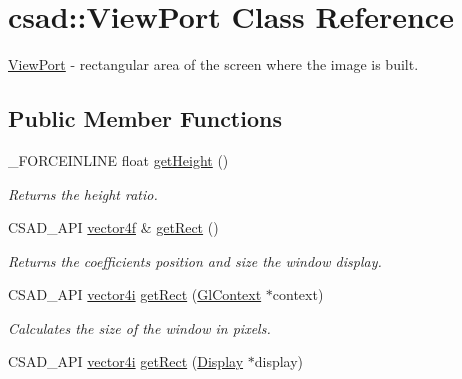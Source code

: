 \hypertarget{classcsad_1_1_view_port}{\section{csad\-:\-:View\-Port Class Reference}
\label{classcsad_1_1_view_port}
}


\hyperlink{classcsad_1_1_view_port}{View\-Port} -\/ rectangular area of the screen where the image is built.  


\subsection*{Public Member Functions}
\begin{DoxyCompactItemize}
\item 
\hypertarget{classcsad_1_1_view_port_a8e7daa8559a2fa9be052f44ba3d3e703}{\-\_\-\-F\-O\-R\-C\-E\-I\-N\-L\-I\-N\-E float \hyperlink{classcsad_1_1_view_port_a8e7daa8559a2fa9be052f44ba3d3e703}{get\-Height} ()}\label{classcsad_1_1_view_port_a8e7daa8559a2fa9be052f44ba3d3e703}

\begin{DoxyCompactList}\small\item\em Returns the height ratio. \end{DoxyCompactList}\item 
\hypertarget{classcsad_1_1_view_port_a0ad927fcbd22508c7bdd613c02c5d53b}{C\-S\-A\-D\-\_\-\-A\-P\-I \hyperlink{classbt_1_1vector4f}{vector4f} \& \hyperlink{classcsad_1_1_view_port_a0ad927fcbd22508c7bdd613c02c5d53b}{get\-Rect} ()}\label{classcsad_1_1_view_port_a0ad927fcbd22508c7bdd613c02c5d53b}

\begin{DoxyCompactList}\small\item\em Returns the coefficients position and size the window display. \end{DoxyCompactList}\item 
\hypertarget{classcsad_1_1_view_port_ac9f6d3c02440a2c9acba861a0573386b}{C\-S\-A\-D\-\_\-\-A\-P\-I \hyperlink{classbt_1_1vector4i}{vector4i} \hyperlink{classcsad_1_1_view_port_ac9f6d3c02440a2c9acba861a0573386b}{get\-Rect} (\hyperlink{classcsad_1_1_gl_context}{Gl\-Context} $\ast$context)}\label{classcsad_1_1_view_port_ac9f6d3c02440a2c9acba861a0573386b}

\begin{DoxyCompactList}\small\item\em Calculates the size of the window in pixels. \end{DoxyCompactList}\item 
\hypertarget{classcsad_1_1_view_port_a23d82391b0590323949d6ff035b24b1d}{C\-S\-A\-D\-\_\-\-A\-P\-I \hyperlink{classbt_1_1vector4i}{vector4i} \hyperlink{classcsad_1_1_view_port_a23d82391b0590323949d6ff035b24b1d}{get\-Rect} (\hyperlink{classcsad_1_1_display}{Display} $\ast$display)}\label{classcsad_1_1_view_port_a23d82391b0590323949d6ff035b24b1d}


\end{DoxyCompactItemize}
